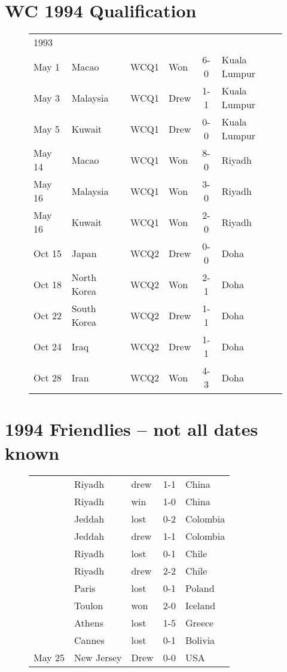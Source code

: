 \section{WC 1994 Qualification}
\begin{figure}[H]
\begin{tabular}{l l c l c l}
1993 & & & & & \\
May 1 & Macao & WCQ1 & Won & 6-0 & Kuala Lumpur \\
May 3 & Malaysia & WCQ1 & Drew & 1-1 & Kuala Lumpur \\
May 5 & Kuwait & WCQ1 & Drew & 0-0 & Kuala Lumpur \\
May 14 & Macao & WCQ1 & Won & 8-0 & Riyadh \\
May 16 & Malaysia & WCQ1 & Won & 3-0 & Riyadh \\
May 16 & Kuwait & WCQ1 & Won & 2-0 & Riyadh \\
Oct 15 & Japan & WCQ2 & Drew  & 0-0 & Doha \\
Oct 18 & North Korea & WCQ2 & Won  & 2-1 & Doha \\
Oct 22 & South Korea & WCQ2 & Drew  & 1-1 & Doha \\
Oct 24 & Iraq & WCQ2 & Drew  & 1-1 & Doha \\
Oct 28 & Iran & WCQ2 & Won  & 4-3 & Doha \\
\end{tabular}
\end{figure}
\section{1994 Friendlies -- not all dates known}
\begin{figure}[H]
\begin{tabular}{l l l c l}
& Riyadh & drew & 1-1 & China \\
& Riyadh & win & 1-0 & China \\
& Jeddah & lost & 0-2 & Colombia \\
& Jeddah & drew & 1-1 & Colombia \\
& Riyadh & lost & 0-1 & Chile \\
& Riyadh & drew & 2-2 & Chile \\
& Paris & lost & 0-1 & Poland \\
& Toulon & won & 2-0 & Iceland \\
& Athens & lost & 1-5 & Greece \\
& Cannes & lost & 0-1 & Bolivia \\
May 25 & New Jersey & Drew & 0-0 & USA \\
\end{tabular}
\end{figure}
